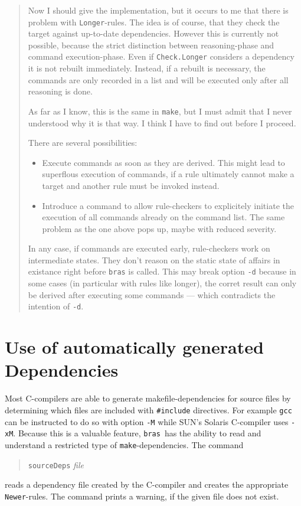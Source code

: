 \documentclass[12pt]{article}
\newcommand{\bras}{\texttt{bras}}
\newcommand{\make}{\texttt{make}}
\begin{document}
\begin{quote}\sffamily
Now I should give the implementation, but it occurs to me that there
is problem with \texttt{Longer}-rules. The idea is of course, that
they check the target against up-to-date dependencies. However this is
currently not possible, because the strict distinction between
reasoning-phase and command execution-phase. Even if
\texttt{Check.Longer} considers a dependency it is not rebuilt
immediately. Instead, if a rebuilt is necessary, the commands are only
recorded in a list and will be executed only after all reasoning is
done.

As far as I know, this is the same in \make{}, but I must admit that I
never understood why it is that way. I think I have to find out before
I proceed.

There are several possibilities:
\begin{itemize}
\item
Execute commands as soon as they are derived. This might lead to
superflous execution of commands, if a rule ultimately cannot make a
target and another rule must be invoked instead.
\item 
Introduce a command to allow rule-checkers to explicitely initiate the
execution of all commands already on the command list. The same
problem as the one above pops up, maybe with reduced severity.
\end{itemize}

In any case, if commands are executed early, rule-checkers work on
intermediate states. They don't reason on the static state of affairs
in existance right before \bras{} is called. This may break
option \texttt{-d} because in some cases (in particular with rules
like longer), the corret result can only be derived after executing
some commands --- which contradicts the intention of \texttt{-d}.
\end{quote}



\section{Use of automatically generated Dependencies}

Most C-compilers are able to generate makefile-dependencies for
source files by determining which files are included with
\texttt{\#include} directives. For example \texttt{gcc} can be
instructed to do so with option \texttt{-M} while SUN's Solaris
C-compiler uses \texttt{-xM}. Because this is a valuable feature,
\bras\ has the ability to read and understand a restricted type of
\make-dependencies. The command
\begin{quote}
  \texttt{sourceDeps} \textit{file}
\end{quote}
reads a dependency file created by the C-compiler and creates the
appropriate \texttt{Newer}-rules. The command prints a warning, if
the given file does not exist.
   
\end{document}
